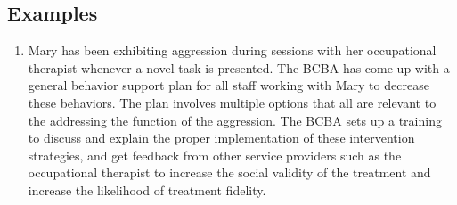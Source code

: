 \subsection{Examples}
\begin{enumerate}
\item Mary has been exhibiting aggression during sessions with her occupational therapist whenever a novel task is presented. The BCBA has come up with a general behavior support plan for all staff working with Mary to decrease these behaviors. The plan involves multiple options that all are relevant to the addressing the function of the aggression. The BCBA sets up a training to discuss and explain the proper implementation of these intervention strategies, and get feedback from other service providers such as the occupational therapist to increase the social validity of the treatment and increase the likelihood of treatment fidelity.
%
\end{enumerate}
%
